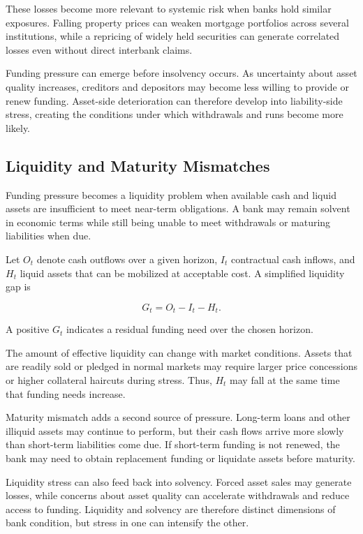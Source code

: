 These losses become more relevant to systemic risk when banks hold similar exposures. Falling property prices can weaken mortgage portfolios across several institutions, while a repricing of widely held securities can generate correlated losses even without direct interbank claims.

Funding pressure can emerge before insolvency occurs. As uncertainty about asset quality increases, creditors and depositors may become less willing to provide or renew funding. Asset-side deterioration can therefore develop into liability-side stress, creating the conditions under which withdrawals and runs become more likely.

\subsection{Liquidity and Maturity Mismatches}

Funding pressure becomes a liquidity problem when available cash and liquid assets are insufficient to meet near-term obligations. A bank may remain solvent in economic terms while still being unable to meet withdrawals or maturing liabilities when due.

Let \(O_t\) denote cash outflows over a given horizon, \(I_t\) contractual cash inflows, and \(H_t\) liquid assets that can be mobilized at acceptable cost. A simplified liquidity gap is

\begin{equation}
G_t
=
O_t-I_t-H_t.
\label{eq:ch21-liquidity-gap}
\end{equation}

A positive \(G_t\) indicates a residual funding need over the chosen horizon.

The amount of effective liquidity can change with market conditions. Assets that are readily sold or pledged in normal markets may require larger price concessions or higher collateral haircuts during stress. Thus, \(H_t\) may fall at the same time that funding needs increase.

Maturity mismatch adds a second source of pressure. Long-term loans and other illiquid assets may continue to perform, but their cash flows arrive more slowly than short-term liabilities come due. If short-term funding is not renewed, the bank may need to obtain replacement funding or liquidate assets before maturity.

Liquidity stress can also feed back into solvency. Forced asset sales may generate losses, while concerns about asset quality can accelerate withdrawals and reduce access to funding. Liquidity and solvency are therefore distinct dimensions of bank condition, but stress in one can intensify the other.

